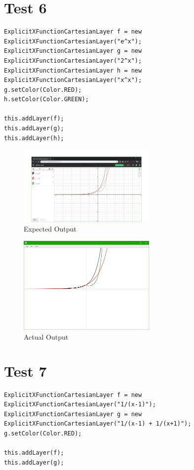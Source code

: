 \documentclass[../../../main.tex]{subfiles}
\begin{document}
\section{Test 6}
\begin{verbatim}
ExplicitXFunctionCartesianLayer f = new ExplicitXFunctionCartesianLayer("e^x");
ExplicitXFunctionCartesianLayer g = new ExplicitXFunctionCartesianLayer("2^x");
ExplicitXFunctionCartesianLayer h = new ExplicitXFunctionCartesianLayer("x^x");
g.setColor(Color.RED);
h.setColor(Color.GREEN);

this.addLayer(f);
this.addLayer(g);
this.addLayer(h);
\end{verbatim}

\begin{figure}[H]
	\centering
	\includegraphics[width=0.6\textwidth]{tests/expected6}
	\caption{Expected Output}
\end{figure}

\begin{figure}[H]
	\centering
	\includegraphics[width=0.6\textwidth]{tests/actual6}
	\caption{Actual Output}
\end{figure}
\newpage

\section{Test 7}
\begin{verbatim}
ExplicitXFunctionCartesianLayer f = new ExplicitXFunctionCartesianLayer("1/(x-1)");
ExplicitXFunctionCartesianLayer g = new ExplicitXFunctionCartesianLayer("1/(x-1) + 1/(x+1)");
g.setColor(Color.RED);

this.addLayer(f);
this.addLayer(g);
\end{verbatim}
\end{document}
